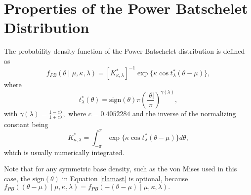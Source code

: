 \newpage

\appendix

\newcommand{\gamlam}{\gamma(\lambda)}
\newcommand{\pimingl}{\pi^{1 - \gamma(\lambda)}}
\newcommand{\sumin}{\sum_{i = 1}^n}

\section{Properties of the Power Batschelet Distribution} \label{app:powbat}

The probability density function of the Power Batschelet distribution is defined as
\begin{equation} \label{eqn:powbatpdf}
 f_{PB}(\theta \mid \mu, \kappa, \lambda) = [K^\ast_{\kappa, \lambda}]^{-1} \exp\{\kappa \cos t^\ast_\lambda(\theta - \mu)\},
\end{equation}
where
\begin{equation} \label{tlamast}
  t_{\lambda}^\ast(\theta) = \text{sign}(\theta)\pi \left( \frac{\vert\theta\vert}{\pi} \right)^{\gamlam},
\end{equation}
with \(\gamlam = \frac{1 - c\lambda}{1 + c\lambda},\) where \(c = 0.4052284\) and the inverse of the normalizing constant being
\begin{equation}
   K^\ast_{\kappa, \lambda} = \int_{-\pi}^\pi \exp\{\kappa \cos t^\ast_\lambda(\theta - \mu)\} d\theta,
\end{equation}
which is usually numerically integrated.

Note that for any symmetric base density, such as the von Mises used in this case, the $\text{sign}(\theta)$ in Equation \ref{tlamast} is optional, because $f_{PB}((\theta - \mu) \mid \mu, \kappa, \lambda) = f_{PB}(-(\theta - \mu) \mid \mu, \kappa, \lambda).$

